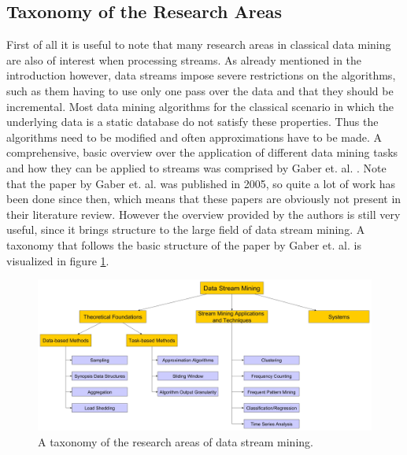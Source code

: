 \subsection{Taxonomy of the Research Areas}
First of all it is useful to note that many research areas in classical data mining are also of interest when processing streams. As already mentioned in the introduction however, data streams impose severe restrictions on the algorithms, such as them having to use only one pass over the data and that they should be incremental. Most data mining algorithms for the classical scenario in which the underlying data is a static database do not satisfy these properties. Thus the algorithms need to be modified and often approximations have to be made. A comprehensive, basic overview over the application of different data mining tasks and how they can be applied to streams was comprised by Gaber et. al. \cite{gaber2005mining}. Note that the paper by Gaber et. al. was published in 2005, so quite a lot of work has been done since then, which means that these papers are obviously not present in their literature review. However the overview provided by the authors is still very useful, since it brings structure to the large field of data stream mining. A taxonomy that follows the basic structure of the paper by Gaber et. al. is visualized in figure \ref{fig_streamMiningTaxonomy}.

\begin{figure}[h]
	\centering
  	\includegraphics[width=\textwidth]{streamMiningTaxonomy}
	\caption{A taxonomy of the research areas of data stream mining.}
	\label{fig_streamMiningTaxonomy}
\end{figure}


